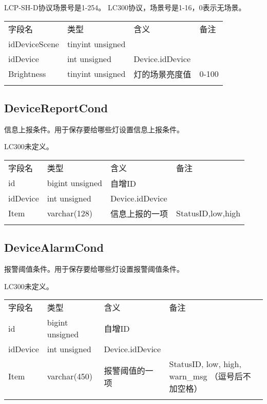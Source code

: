 LCP-SH-D协议场景号是1-254。 LC300协议，场景号是1-16，0表示无场景。

\begin{longtabu}[c]{@{}lXXX@{}}
\toprule\addlinespace
字段名 & 类型 & 含义 & 备注
\\\addlinespace
\midrule\endhead
idDeviceScene & tinyint unsigned & &
\\\addlinespace
idDevice & int unsigned & Device.idDevice &
\\\addlinespace
Brightness & tinyint unsigned & 灯的场景亮度值 & 0-100
\\\addlinespace
\bottomrule
\end{longtabu}

\subsection{DeviceReportCond}\label{devicereportcond}

信息上报条件。用于保存要给哪些灯设置信息上报条件。

LC300未定义。

\begin{longtabu}[c]{@{}lXXX@{}}
\toprule\addlinespace
字段名 & 类型 & 含义 & 备注
\\\addlinespace
\midrule\endhead
id & bigint unsigned & 自增ID &
\\\addlinespace
idDevice & int unsigned & Device.idDevice &
\\\addlinespace
Item & varchar(128) & 信息上报的一项 & StatusID,low,high
\\\addlinespace
\bottomrule
\end{longtabu}

\subsection{DeviceAlarmCond}\label{devicealarmcond}

报警阈值条件。用于保存要给哪些灯设置报警阈值条件。

LC300未定义。

\begin{longtabu}[c]{@{}lXXX@{}}
\toprule\addlinespace
字段名 & 类型 & 含义 & 备注
\\\addlinespace
\midrule\endhead
id & bigint unsigned & 自增ID &
\\\addlinespace
idDevice & int unsigned & Device.idDevice &
\\\addlinespace
Item & varchar(450) & 报警阈值的一项 & StatusID, low, high, warn\_msg
（逗号后不加空格）
\\\addlinespace
\bottomrule
\end{longtabu}

